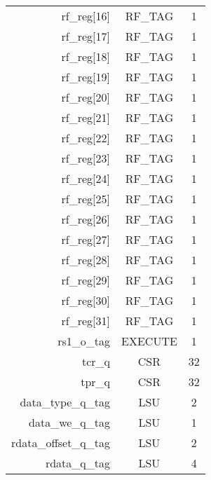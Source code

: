 \begin{table}
\begin{tabular}{rcc}
rf\_reg[16] & RF\_TAG & 1 \\
rf\_reg[17] & RF\_TAG & 1 \\
rf\_reg[18] & RF\_TAG & 1 \\
rf\_reg[19] & RF\_TAG & 1 \\
rf\_reg[20] & RF\_TAG & 1 \\
rf\_reg[21] & RF\_TAG & 1 \\
rf\_reg[22] & RF\_TAG & 1 \\
rf\_reg[23] & RF\_TAG & 1 \\
rf\_reg[24] & RF\_TAG & 1 \\
rf\_reg[25] & RF\_TAG & 1 \\
rf\_reg[26] & RF\_TAG & 1 \\
rf\_reg[27] & RF\_TAG & 1 \\
rf\_reg[28] & RF\_TAG & 1 \\
rf\_reg[29] & RF\_TAG & 1 \\
rf\_reg[30] & RF\_TAG & 1 \\
rf\_reg[31] & RF\_TAG & 1 \\
rs1\_o\_tag & EXECUTE & 1 \\
tcr\_q & CSR & 32 \\
tpr\_q & CSR & 32 \\
data\_type\_q\_tag & LSU & 2 \\
data\_we\_q\_tag & LSU & 1 \\
rdata\_offset\_q\_tag & LSU & 2 \\
rdata\_q\_tag & LSU & 4 \\
\bottomrule
\end{tabular}
\end{table}
